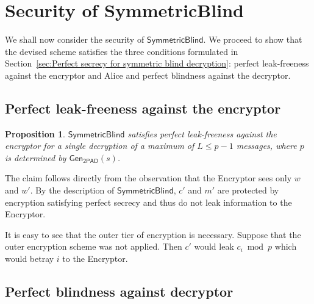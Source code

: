 \documentclass[10pt,journal]{IEEEtran}
\newcommand{\alg}[1]{\mathsf{#1}}
\newcommand{\sch}[1]{\mathsf{#1}}
\newtheorem{proposition}{Proposition}[section]
\begin{document}
\section{Security of SymmetricBlind}
\label{sec:Security of devised scheme}

We shall now consider the security of $\sch{SymmetricBlind}$. We proceed to show that the devised
scheme satisfies the three conditions formulated in Section~\ref{sec:Perfect secrecy for symmetric blind decryption}:
perfect leak-freeness against the encryptor and Alice and perfect blindness against the decryptor.

\subsection{Perfect leak-freeness against the encryptor}

\begin{proposition}
$\sch{SymmetricBlind}$ satisfies perfect leak-freeness against the encryptor for a single decryption
of a maximum of $L \leq p-1$ messages, where $p$ is determined by $\alg{Gen}_{\sch{2PAD}}(s)$.
\end{proposition}
\begin{IEEEproof}
The claim follows directly from the observation that the Encryptor sees only $w$ and $w'$. By the description
of $\sch{SymmetricBlind}$, $c'$
and $m'$ are protected by encryption satisfying perfect secrecy and thus do not
leak information to the Encryptor.
\end{IEEEproof}

It is easy to see that the outer tier of encryption is necessary.
Suppose that the outer encryption scheme was not applied. Then $c'$
would leak $c_i \bmod{p}$ which would betray $i$ to the Encryptor.

\subsection{Perfect blindness against decryptor}
\end{document}
